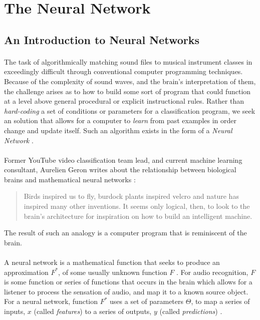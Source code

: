 \documentclass[12pt,letterpaper]{article}
\begin{document}

\newpage
\section{The Neural Network}
\label{sec-TheNeuralNetwork}


\subsection{An Introduction to Neural Networks}
\label{subsec-NerualNetworkIntro}

\paragraph*{}The task of algorithmically matching sound files to musical instrument classes in exceedingly difficult through conventional computer programming techniques. Because of the complexity of sound waves, and the brain's interpretation of them, the challenge arises as to how to build some sort of program that could function at a level above general procedural or explicit instructional rules. Rather than \textit{hard-coding} a set of conditions or parameters for a classification program, we seek an solution that allows for a computer to \textit{learn} from past examples in order change and update itself. Such an algorithm exists in the form of a \textit{Neural Network} \cite{Geron2,Goodfellow,Levine}.

\paragraph*{}Former YouTube video classification team lead, and current machine learning consultant, Aurelien Geron writes about the relationship between biological brains and mathematical neural networks \cite{Geron}: 
\begin{quote}
Birds inspired us to fly, burdock plants inspired velcro and nature has inspired many other inventions. It seems only logical, then, to look to the brain's architecture for inspiration on how to build an intelligent machine.
\end{quote}
The result of such an analogy is a computer program that is reminiscent of the brain.

\paragraph*{}A neural network is a mathematical function that seeks to produce an approximation $F^*$, of some usually unknown function $F$ . For audio recognition, $F$ is some function or series of functions that occurs in the brain which allows for a listener to process the sensation of audio, and map it to a known source object. For a neural network, function $F^*$ uses a set of parameters $\Theta$, to map a series of inputs, $x$ (called \textit{features}) to a series of outputs, $y$ (called \textit{predictions}) \cite{Goodfellow,James,Virtanen}.
\end{document}
